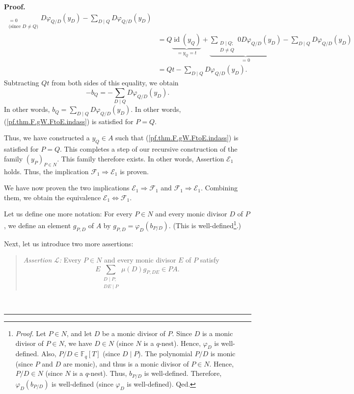 \documentclass[numbers=enddot,12pt,final,onecolumn,notitlepage]{scrartcl}%
\theoremstyle{definition}
\newenvironment{statement}{\begin{quote}}{\end{quote}}
\newenvironment{proof}[1][Proof]{\noindent\textbf{#1.} }{\ \rule{0.5em}{0.5em}}
\let\sumnonlimits\sum
\renewcommand{\sum}{\sumnonlimits\limits}
\begin{document}
\begin{proof}
\begin{align*}
_{\substack{=0\\\text{(since }D\neq Q\text{)}}}D\varphi_{Q/D}\left(
y_{D}\right)  -\sum_{D\mid Q}D\varphi_{Q/D}\left(  y_{D}\right) \\
&  =Q\underbrace{\operatorname*{id}\left(  y_{Q}\right)  }_{=y_{Q}%
=t}+\underbrace{\sum_{\substack{D\mid Q;\\D\neq Q}}0D\varphi_{Q/D}\left(
y_{D}\right)  }_{=0}-\sum_{D\mid Q}D\varphi_{Q/D}\left(  y_{D}\right) \\
&  =Qt-\sum_{D\mid Q}D\varphi_{Q/D}\left(  y_{D}\right)  .
\end{align*}
Subtracting $Qt$ from both sides of this equality, we obtain%
\[
-b_{Q}=-\sum_{D\mid Q}D\varphi_{Q/D}\left(  y_{D}\right)  .
\]
In other words, $b_{Q}=\sum_{D\mid Q}D\varphi_{Q/D}\left(  y_{D}\right)  $. In
other words, (\ref{pf.thm.F.gW.FtoE.indass}) is satisfied for $P=Q$.

Thus, we have constructed a $y_{Q}\in A$ such that
(\ref{pf.thm.F.gW.FtoE.indass}) is satisfied for $P=Q$. This completes a step
of our recursive construction of the family $\left(  y_{P}\right)  _{P\in N}$.
This family therefore exists. In other words, Assertion $\mathcal{E}_{1}$
holds. Thus, the implication $\mathcal{F}_{1}\Longrightarrow\mathcal{E}_{1}$
is proven.

We have now proven the two implications $\mathcal{E}_{1}\Longrightarrow
\mathcal{F}_{1}$ and $\mathcal{F}_{1}\Longrightarrow\mathcal{E}_{1}$.
Combining them, we obtain the equivalence $\mathcal{E}_{1}\Longleftrightarrow
\mathcal{F}_{1}$.

Let us define one more notation: For every $P\in N$ and every monic divisor
$D$ of $P$, we define an element $g_{P,D}$ of $A$ by $g_{P,D}=\varphi
_{D}\left(  b_{P/D}\right)  $. (This is well-defined\footnote{\textit{Proof.}
Let $P\in N$, and let $D$ be a monic divisor of $P$. Since $D$ is a monic
divisor of $P\in N$, we have $D\in N$ (since $N$ is a $q$-nest). Hence,
$\varphi_{D}$ is well-defined. Also, $P/D\in\mathbb{F}_{q}\left[  T\right]  $
(since $D\mid P$). The polynomial $P/D$ is monic (since $P$ and $D$ are
monic), and thus is a monic divisor of $P\in N$. Hence, $P/D\in N$ (since $N$
is a $q$-nest). Thus, $b_{P/D}$ is well-defined. Therefore, $\varphi
_{D}\left(  b_{P/D}\right)  $ is well-defined (since $\varphi_{D}$ is
well-defined). Qed.}.)

Next, let us introduce two more assertions:

\begin{statement}
\textit{Assertion }$\mathcal{L}$\textit{:} Every $P\in N$ and every monic
divisor $E$ of $P$ satisfy%
\[
E\sum_{\substack{D\mid P;\\DE\mid P}}\mu\left(  D\right)  g_{P,DE}\in PA.
\]


\end{statement}
\end{proof}
\end{document}
